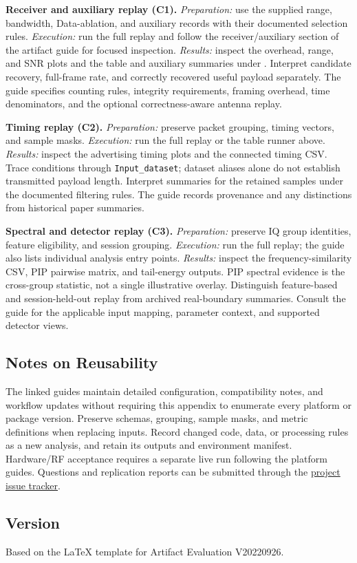 \documentclass[nonacm,sigconf]{acmart}
\begin{document}
\begin{compactitem}
\item[(E1)] \textbf{Receiver and auxiliary replay (C1).}
\emph{Preparation:} use the supplied range, bandwidth, Data-ablation, and
auxiliary records with their documented selection rules.
\emph{Execution:} run the full replay and follow the receiver/auxiliary section
of the artifact guide for focused inspection.
\emph{Results:} inspect the overhead, range, and SNR plots and the table and
auxiliary summaries under . Interpret candidate recovery,
full-frame rate, and correctly recovered useful payload separately. The guide
specifies counting rules, integrity requirements, framing overhead, time
denominators, and the optional correctness-aware antenna replay.

\item[(E2)] \textbf{Timing replay (C2).}
\emph{Preparation:} preserve packet grouping, timing vectors, and sample masks.
\emph{Execution:} run the full replay or the table runner above.
\emph{Results:} inspect the advertising timing plots and the connected timing
CSV. Trace conditions through \texttt{Input\_dataset}; dataset aliases alone
do not establish transmitted payload length. Interpret summaries for the
retained samples under the documented filtering rules. The guide records
provenance and any distinctions from historical paper summaries.

\item[(E3)] \textbf{Spectral and detector replay (C3).}
\emph{Preparation:} preserve IQ group identities, feature eligibility, and
session grouping. \emph{Execution:} run the full replay; the guide also lists
individual analysis entry points.
\emph{Results:} inspect the frequency-similarity CSV, PIP pairwise matrix, and
tail-energy outputs. PIP spectral evidence is the cross-group statistic, not a
single illustrative overlay. Distinguish feature-based and session-held-out
replay from archived real-boundary summaries. Consult the guide for the
applicable input mapping, parameter context, and supported detector views.
\end{compactitem}

\subsection{Notes on Reusability}
The linked guides maintain detailed configuration, compatibility notes, and
workflow updates without requiring this appendix to enumerate every platform
or package version. Preserve schemas, grouping, sample masks, and metric
definitions when replacing inputs. Record changed code, data, or processing
rules as a new analysis, and retain its outputs and environment manifest.
Hardware/RF acceptance requires a separate live run following the platform
guides. Questions and replication reports can be submitted through the
\href{https://github.com/Tincyu/PhantomChannel/issues}{project issue tracker}.

\subsection{Version}
Based on the LaTeX template for Artifact Evaluation V20220926.
\end{document}
